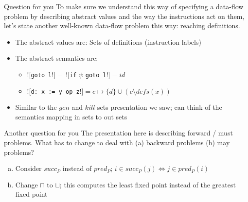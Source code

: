 \documentclass{beamer}
\begin{document}
\begin{frame}{Question for you}
To make sure we understand this way of specifying a data-flow problem by
describing abstract values and the way the instructions act on them, let's
state another well-known data-flow problem this way: reaching definitions.

\begin{itemize}
\item The abstract values are: \pause Sets of definitions (instruction labels)
\item The abstract semantics are: \pause
\begin{itemize}
\item $![${\tt goto l}$!] = \, ![${\tt if} $\psi$ {\tt goto l}$!] = id$
\item $![${\tt d: x := y op z}$!] = c \mapsto \{d\} \cup (c \setminus defs(x))$
\end{itemize}
\item Similar to the $gen$ and $kill$ sets presentation we saw; can think
of the semantics mapping in sets to out sets
\end{itemize}
\end{frame}

\begin{frame}{Another question for you}
The presentation here is describing forward / must problems. What has to
change to deal with (a) backward problems (b) may problems?
\begin{enumerate}[(a)]
\pause
\item Consider $succ_P$ instead of $pred_P$; $i \in succ_P(j) \iff j \in pred_P(i)$
\pause
\item Change $\sqcap$ to $\sqcup$; this computes the least fixed point
instead of the greatest fixed point
\end{enumerate}
\end{frame}
\end{document}
